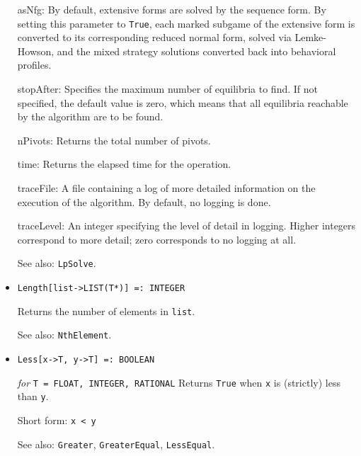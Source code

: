 \begin{itemize}
{\it for} {\tt T = FLOAT, RATIONAL}
\bd
Solves the game as a linear complementarity problem, using the
Lemke-Howson algorithm for normal form games, and the
Koller-Megiddo-Stengel sequence form for extensive form games.  


The behavior of the algorithm may be modified by the following
optional parameters:
\bd
\item
[asNfg:] By default, extensive forms are solved by the sequence form.
By setting this parameter to \verb+True+, each marked subgame of the extensive
form is converted to its corresponding reduced normal form, solved
via Lemke-Howson, and the mixed strategy solutions converted back into
behavioral profiles.
\item
[stopAfter:] Specifies the maximum number of equilibria to find.  If
not specified, the default value is zero, which means that all
equilibria reachable by the algorithm are to be found.
\item
[nPivots:] Returns the total number of pivots. 
\item
[time:] Returns the elapsed time for the operation.
\item
[traceFile:] A file containing a log of more detailed information on the
execution of the algorithm.  By default, no logging is done.
\item
[traceLevel:] An integer specifying the level of detail in logging.
Higher integers correspond to more detail; zero corresponds to no
logging at all.
\ed
\item [See also:] \verb+LpSolve+.
\ed

\item
\protect \large \begin{verbatim}
Length[list->LIST(T*)] =: INTEGER
\end{verbatim}\normalsize

\bd
Returns the number of elements in \verb+list+.
\item
[See also:] {\tt NthElement}.
\ed

\item
\protect \large \begin{verbatim}
Less[x->T, y->T] =: BOOLEAN
\end{verbatim}\normalsize

{\it for} {\tt T = FLOAT, INTEGER, RATIONAL}
\bd
Returns \verb+True+ when \verb+x+ is (strictly) less than \verb+y+.
\item [Short form:] \verb+x < y+
\item [See also:] \verb+Greater+, \verb+GreaterEqual+, \verb+LessEqual+.
\ed


\end{itemize}
